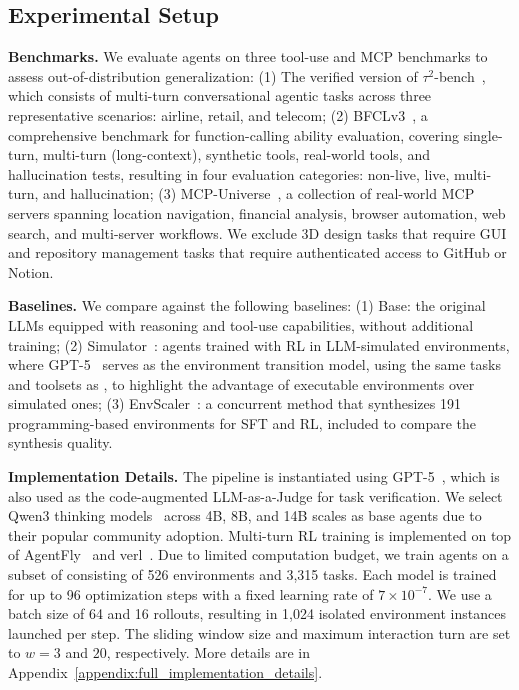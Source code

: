 \documentclass{article}
\theoremstyle{plain}
\theoremstyle{definition}
\theoremstyle{remark}
\newcommand{\synth}{\textls{\textsc{AWM}}\xspace}
\newcommand{\taubench}{$\tau^2$-bench\xspace}
\newcommand{\myparagraph}[1]{\noindent\textbf{#1}}
\begin{document}
\subsection{Experimental Setup}
\myparagraph{Benchmarks.}
We evaluate agents on three tool-use and MCP benchmarks to assess out-of-distribution generalization:
(1) The verified version of \taubench~\citep{taubench2,verified_tau2}, which consists of multi-turn conversational agentic tasks across three representative scenarios: airline, retail, and telecom;
(2) BFCLv3~\citep{bfcl}, a comprehensive benchmark for function-calling ability evaluation, covering single-turn, multi-turn (long-context), synthetic tools, real-world tools, and hallucination tests, resulting in four evaluation categories: non-live, live, multi-turn, and hallucination;
(3) MCP-Universe~\citep{mcpuniverse}, a collection of real-world MCP servers spanning location navigation, financial analysis, browser automation, web search, and multi-server workflows. We exclude 3D design tasks that require GUI and repository management tasks that require authenticated access to GitHub or Notion.

\myparagraph{Baselines.}
We compare against the following baselines:
(1) Base: the original LLMs equipped with reasoning and tool-use capabilities, without additional training;
(2) Simulator~\citep{li2025simulatingenvironmentsreasoningmodels,chen2025scalingagentlearningexperience}: agents trained with RL in LLM-simulated environments, where GPT-5~\citep{openai_gpt5_2025} serves as the environment transition model, using the same tasks and toolsets as \synth, to highlight the advantage of executable environments over simulated ones;
(3) EnvScaler~\citep{envscaler}: a concurrent method that synthesizes 191 programming-based environments for SFT and RL, included to compare the synthesis quality.


\myparagraph{Implementation Details.}
The \synth pipeline is instantiated using GPT-5~\citep{openai_gpt5_2025}, which is also used as the code-augmented LLM-as-a-Judge for task verification.
We select Qwen3 thinking models~\citep{qwen3} across 4B, 8B, and 14B scales as base agents due to their popular community adoption.
Multi-turn RL training is implemented on top of AgentFly~\citep{wang2025agentfly} and verl~\citep{verl}.
Due to limited computation budget, we train agents on a subset of \synth consisting of 526 environments and 3,315 tasks.
Each model is trained for up to 96 optimization steps with a fixed learning rate of $7\times10^{-7}$.
We use a batch size of 64 and 16 rollouts, resulting in 1,024 isolated environment instances launched per step.
The sliding window size and maximum interaction turn are set to $w=3$ and $20$, respectively.
More details are in Appendix~\ref{appendix:full_implementation_details}.
\end{document}

